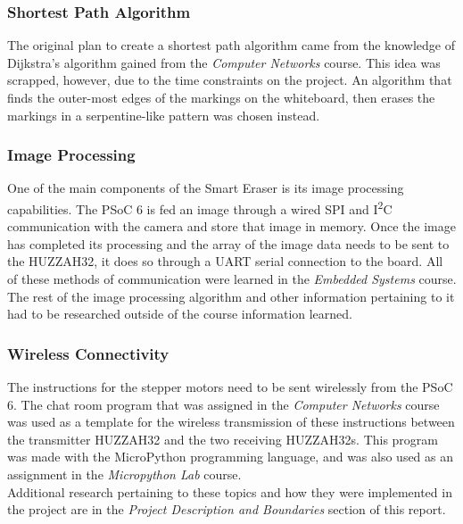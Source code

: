 \subsubsection{Shortest Path Algorithm}
The original plan to create a shortest path algorithm came from the knowledge of Dijkstra's algorithm gained from the \textit{Computer Networks} course. This idea was scrapped, however, due to the time constraints on the project. An algorithm that finds the outer-most edges of the markings on the whiteboard, then erases the markings in a serpentine-like pattern was chosen instead.\\

\subsubsection{Image Processing}
One of the main components of the Smart Eraser is its image processing capabilities. The PSoC 6 is fed an image through a wired SPI and I\textsuperscript{2}C communication with the camera and store that image in memory. Once the image has completed its processing and the array of the image data needs to be sent to the HUZZAH32, it does so through a UART serial connection to the board. All of these methods of communication were learned in the \textit{Embedded Systems} course. The rest of the image processing algorithm and other information pertaining to it had to be researched outside of the course information learned.\\

\subsubsection{Wireless Connectivity}
The instructions for the stepper motors need to be sent wirelessly from the PSoC 6. The chat room program that was assigned in the \textit{Computer Networks} course was used as a template for the wireless transmission of these instructions between the transmitter HUZZAH32 and the two receiving HUZZAH32s. This program was made with the MicroPython programming language, and was also used as an assignment in the \textit{Micropython Lab} course.\\

Additional research pertaining to these topics and how they were implemented in the project are in the \textit{Project Description and Boundaries} section of this report.   

